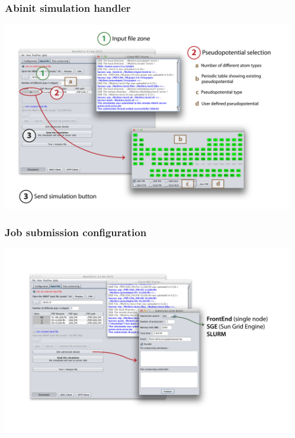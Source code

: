 
\begin{frame}
 \frametitle{Abinit simulation handler}
 \centering
 \includegraphics[height=8.25cm]{f2}
\end{frame}

\begin{frame}
 \frametitle{Job submission configuration}
 \centering
 \includegraphics[height=8.25cm]{f2_bis}
\end{frame}

